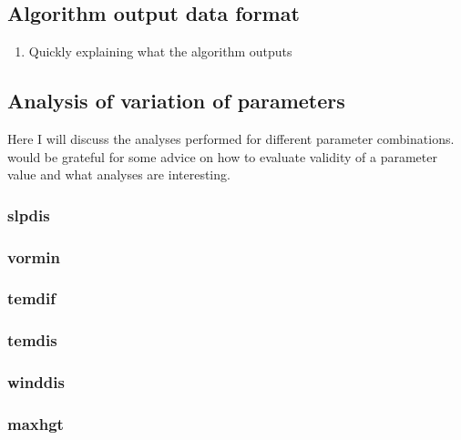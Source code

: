 \subsection{Algorithm output data format}
\begin{enumerate}
    \item Quickly explaining what the algorithm outputs
\end{enumerate}
\subsection{Analysis of variation of parameters}
Here I will discuss the analyses performed for different parameter combinations.
would be grateful for some advice on how to evaluate validity of a parameter value and what analyses are interesting.
\subsubsection{slpdis}
\subsubsection{vormin}
\subsubsection{temdif}
\subsubsection{temdis}
\subsubsection{winddis}
\subsubsection{maxhgt}





